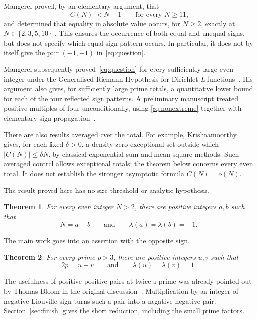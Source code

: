 \documentclass[11pt,a4paper]{article}
\newtheorem{theorem}{Theorem}[section]
\theoremstyle{remark}
\numberwithin{equation}{section}
\newcommand{\lam}{\lambda}
\begin{document}
Mangerel proved, by an elementary argument, that
\begin{equation}\label{eq:nonextreme}
  |C(N)|<N-1\qquad\text{for every }N\ge11,
\end{equation}
and determined that equality in absolute value occurs, for \(N\ge2\),
exactly at \(N\in\{2,3,5,10\}\)~\cite[Theorem~1.2]{MangerelGoldbach}.
This ensures the occurrence of both equal and unequal signs, but does not
specify which equal-sign pattern occurs. In particular, it does not by
itself give the pair \((-1,-1)\) in~\eqref{eq:question}.

Mangerel subsequently proved~\eqref{eq:question} for every sufficiently
large even integer under the Generalised Riemann Hypothesis for Dirichlet
\(L\)-functions~\cite[Theorem~1.2]{MangerelSigns}. His argument also gives,
for sufficiently large prime totals, a quantitative lower bound for each
of the four reflected sign patterns. A preliminary manuscript treated
positive multiples of four unconditionally, using
\eqref{eq:nonextreme} together with elementary sign
propagation~\cite{MultiplesFour}.

There are also results averaged over the total. For example,
Krishnamoorthy~\cite[Theorem~2]{Krishnamoorthy} gives, for each fixed
\(\delta>0\), a density-zero exceptional set outside which
\(|C(N)|\le\delta N\), by classical exponential-sum and mean-square
methods. Such averaged control allows exceptional totals; the theorem
below concerns every even total. It does not establish the stronger
asymptotic formula \(C(N)=o(N)\).

The result proved here has no size threshold or analytic hypothesis.

\begin{theorem}\label{thm:main}
For every even integer \(N>2\), there are positive integers \(a,b\) such that
\[
  N=a+b\qquad\text{and}\qquad \lam(a)=\lam(b)=-1.
\]
\end{theorem}

The main work goes into an assertion with the opposite sign.

\begin{theorem}\label{thm:prime}
For every prime \(p>3\), there are positive integers \(u,v\) such that
\[
  2p=u+v\qquad\text{and}\qquad \lam(u)=\lam(v)=1.
\]
\end{theorem}

The usefulness of positive-positive pairs at twice a prime was already
pointed out by Thomas Bloom in the original discussion~\cite{MathOverflow}.
Multiplication by an integer of negative Liouville sign turns such a pair
into a negative-negative pair. Section~\ref{sec:finish} gives the short
reduction, including the small prime factors.
\end{document}
